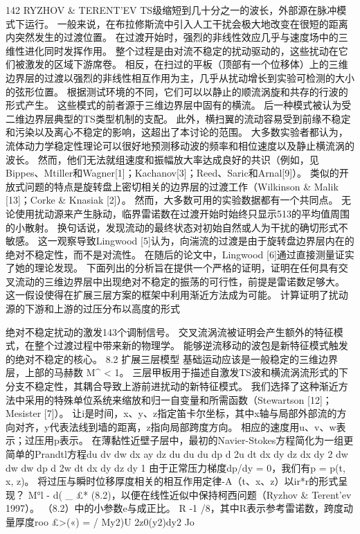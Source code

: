 \documentclass[UTF8,11pt,a4paper,openany,fontset=fandol]{ctexbook}
\begin{document}
142 RYZHOV \& TERENT'EV TS级缩短到几十分之一的波长，外部源在脉冲模式下运行。 一般来说，在布拉修斯流中引入人工干扰会极大地改变在很短的距离内突然发生的过渡位置。 在过渡开始时，强烈的非线性效应几乎与速度场中的三维性进化同时发挥作用。 整个过程是由对流不稳定的扰动驱动的，这些扰动在它们被激发的区域下游席卷。 相反，在扫过的平板（顶部有一个位移体）上的三维边界层的过渡以强烈的非线性相互作用为主，几乎从扰动增长到实验可检测的大小的弦形位置。 根据测试环境的不同，它们可以以静止的顺流涡旋和共存的行波的形式产生。 这些模式的前者源于三维边界层中固有的横流。 后一种模式被认为受二维边界层典型的TS类型机制的支配。 此外，横扫翼的流动容易受到前缘不稳定和污染以及离心不稳定的影响，这超出了本讨论的范围。 大多数实验者都认为，流体动力学稳定性理论可以很好地预测移动波的频率和相位速度以及静止横流涡的波长。 然而，他们无法就组速度和振幅放大率达成良好的共识（例如，见Bippes、Mtiller和Wagner[1]；Kachanov[3]；Reed、Saric和Arnal[9]）。 类似的开放式问题的特点是旋转盘上密切相关的边界层的过渡工作（Wilkinson \& Malik [13]；Corke \& Knasiak [2]）。 然而，大多数可用的实验数据都有一个共同点。 无论使用扰动源来产生脉动，临界雷诺数在过渡开始时始终只显示513的平均值周围的小散射。 换句话说，发现流动的最终状态对初始自然或人为干扰的确切形式不敏感。 这一观察导致Lingwood [5]认为，向湍流的过渡是由于旋转盘边界层内在的绝对不稳定性，而不是对流性。 在随后的论文中，Lingwood [6]通过直接测量证实了她的理论发现。 下面列出的分析旨在提供一个严格的证明，证明在任何具有交叉流动的三维边界层中出现绝对不稳定的振荡的可行性，前提是雷诺数足够大。 这一假设使得在扩展三层方案的框架中利用渐近方法成为可能。 计算证明了扰动源的下游和上游的过压分布以高度的形式

绝对不稳定扰动的激发143个调制信号。 交叉流涡流被证明会产生额外的特征模式，在整个过渡过程中带来新的物理学。 能够逆流移动的波包是新特征模式触发的绝对不稳定的核心。 8.2 扩展三层模型 基础运动应该是一般稳定的三维边界层，上部的马赫数 M\textasciicircum{} < 1。 三层甲板用于描述自激发TS波和横流涡流形式的下分支不稳定性，其耦合导致上游前进扰动的新特征模式。 我们选择了这种渐近方法中采用的特殊单位系统来缩放和归一自变量和所需函数（Stewartson [12]；Mesister [7]）。 让i是时间，x、y、z指定笛卡尔坐标，其中x轴与局部外部流的方向对齐，y代表法线到墙的距离，z指向局部跨度方向。 相应的速度用u、v、w表示；过压用p表示。 在薄黏性近壁子层中，最初的Navier-Stokes方程简化为一组更简单的Prandtl方程du dv dw dx ay dz du du du dp d 2u dt dx dy dz dx dy 2 dw dw dw dp d 2w dt dx dy dz dy 1 由于正常压力梯度dp/dy = 0，我们有p = p(t, x, z)。 将过压与瞬时位移厚度相关的相互作用定律-A（t、x、z）以ir*r的形式呈现？ M°l - d( \_ £* (8.2)，以便在线性近似中保持柯西问题（Ryzhov \& Terent'ev 1997）。 （8.2）中的小参数e与成正比。 R -1 /8，其中R表示参考雷诺数，跨度动量厚度roo £>(«) = / My2)U 2z0(y2)dy2 Jo
\end{document}
